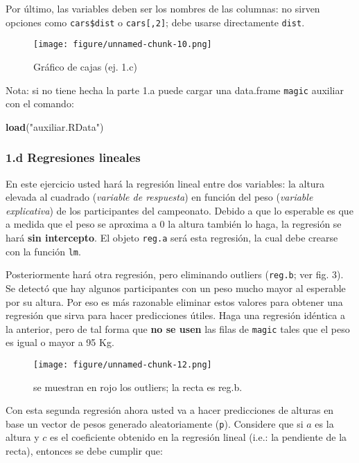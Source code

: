 \documentclass[]{article}
\makeatletter
\newenvironment{Shaded}{}{}
\newcommand{\KeywordTok}[1]{\textcolor[rgb]{0.00,0.44,0.13}{\textbf{{#1}}}}
\newcommand{\StringTok}[1]{\textcolor[rgb]{0.25,0.44,0.63}{{#1}}}
\newcommand{\NormalTok}[1]{{#1}}
\def\maxwidth{\ifdim\Gin@nat@width>\linewidth\linewidth
\else\Gin@nat@width\fi}
\let\Oldincludegraphics\includegraphics
\renewcommand{\includegraphics}[1]{\Oldincludegraphics[width=\maxwidth]{#1}}
\makeatother
\begin{document}
Por último, las variables deben ser los nombres de las columnas: no
sirven opciones como \texttt{cars\$dist} o \texttt{cars{[},2{]}}; debe
usarse directamente \texttt{dist}.

\begin{figure}[htbp]
\centering
\texttt{[image: figure/unnamed-chunk-10.png]}
\caption{Gráfico de cajas (ej. 1.c)}
\end{figure}

Nota: si no tiene hecha la parte 1.a puede cargar una data.frame
\texttt{magic} auxiliar con el comando:

\begin{Shaded}
\begin{Highlighting}[]
\KeywordTok{load}\NormalTok{(}\StringTok{"auxiliar.RData"}\NormalTok{)}
\end{Highlighting}
\end{Shaded}

\subsubsection{1.d Regresiones lineales}

En este ejercicio usted hará la regresión lineal entre dos variables: la
altura elevada al cuadrado (\emph{variable de respuesta}) en función del
peso (\emph{variable explicativa}) de los participantes del campeonato.
Debido a que lo esperable es que a medida que el peso se aproxima a 0 la
altura también lo haga, la regresión se hará \textbf{sin intercepto}. El
objeto \texttt{reg.a} será esta regresión, la cual debe crearse con la
función \texttt{lm}.

Posteriormente hará otra regresión, pero eliminando outliers
(\texttt{reg.b}; ver fig. 3). Se detectó que hay algunos participantes
con un peso mucho mayor al esperable por su altura. Por eso es más
razonable eliminar estos valores para obtener una regresión que sirva
para hacer predicciones útiles. Haga una regresión idéntica a la
anterior, pero de tal forma que \textbf{no se usen} las filas de
\texttt{magic} tales que el peso es igual o mayor a 95 Kg.

\begin{figure}[htbp]
\centering
\texttt{[image: figure/unnamed-chunk-12.png]}
\caption{se muestran en rojo los outliers; la recta es reg.b.}
\end{figure}

Con esta segunda regresión ahora usted va a hacer predicciones de
alturas en base un vector de pesos generado aleatoriamente (\texttt{p}).
Considere que si $a$ es la altura y $c$ es el coeficiente obtenido en la
regresión lineal (i.e.: la pendiente de la recta), entonces se debe
cumplir que:
\end{document}
